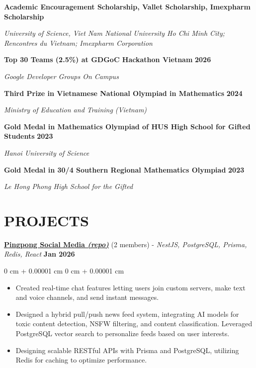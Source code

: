 \documentclass[9pt, letterpaper]{extarticle}
\newenvironment{highlights}{
    \begin{itemize}[
    topsep=2pt,
    itemsep=2pt,
    parsep=0pt,
    partopsep=0pt,
    leftmargin=10pt
]
}{
    \end{itemize}
} %
\newenvironment{onecolentry}{
    \begin{adjustwidth}{
        0 cm + 0.00001 cm
    }{
        0 cm + 0.00001 cm
    }
}{
    \end{adjustwidth}
} %
\begin{document}
    \textbf{Academic Encouragement Scholarship, Vallet Scholarship, Imexpharm Scholarship}
    
    \textit{University of Science, Viet Nam National University Ho Chi Minh City; Rencontres du Vietnam; Imexpharm Corporation}

    \vspace{0.2 cm}
    
    \textbf{Top 30 Teams (2.5\%) at GDGoC Hackathon Vietnam}
    \hfill
    \textbf{2026}

    \textit{Google Developer Groups On Campus}

    \vspace{0.2 cm}
    
    \textbf{Third Prize in Vietnamese National Olympiad in Mathematics}
    \hfill
    \textbf{2024}

    \textit{Ministry of Education and Training (Vietnam)}

    \vspace{0.2 cm}

    \textbf{Gold Medal in Mathematics Olympiad of HUS High School for Gifted Students}
    \hfill
    \textbf{2023}

    \textit{Hanoi University of Science}

    \vspace{0.2 cm}

    \textbf{Gold Medal in 30/4 Southern Regional Mathematics Olympiad}
    \hfill
    \textbf{2023}

    \textit{Le Hong Phong High School for the Gifted}

    
    \section{\textbf{PROJECTS}}
    \underline{\textbf{Pingpong Social Media \href{https://github.com/Tnina2612/Pingpong-Social-Media}{\textit{(\textcolor{customred}{repo})}}}} (2 members) - \textit{NestJS, PostgreSQL, Prisma, Redis, React}
    \hfill
    \textbf{Jan 2026}

    \vspace{0.10 cm}
        
    \begin{onecolentry}
        \begin{highlights}
            \item Created real-time chat features letting users join custom servers, make text and voice channels, and send instant messages.
            \item Designed a hybrid pull/push news feed system, integrating AI models for toxic content detection, NSFW filtering, and content classification. Leveraged PostgreSQL vector search to personalize feeds based on user interests.
            \item Designing scalable RESTful APIs with Prisma and PostgreSQL, utilizing Redis for caching to optimize performance.
        \end{highlights}
    \end{onecolentry}
\end{document}
